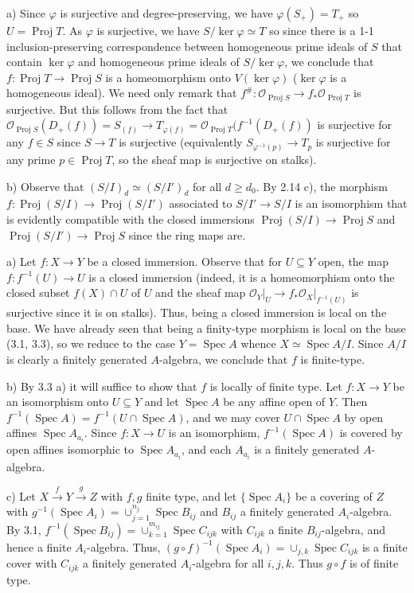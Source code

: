 \documentclass{report}
\renewcommand{\O}{\mathcal{O}}
\DeclareMathOperator{\Spec}{Spec}
\DeclareMathOperator{\Proj}{Proj}
\begin{document}
\bigskip
{}	a)	Since $\varphi$ is surjective and degree-preserving, we have $\varphi(S_+)=T_+$ so $U=\Proj T$.
As $\varphi$ is surjective, we have $S/\ker\varphi\simeq T$ so since there is a 1-1 inclusion-preserving correspondence
between homogeneous prime ideals of $S$ that contain $\ker\varphi$ and homogeneous prime ideals
of $S/\ker\varphi$, we conclude that $f:\Proj T\rightarrow \Proj S$ is a homeomorphism onto $V(\ker\varphi)$
($\ker\varphi$ is a homogeneous ideal).  We need only remark that $f^{\#}:\O_{\Proj S}\rightarrow f_*\O_{\Proj T}$
is surjective.  But this follows from the fact that $\O_{\Proj S}(D_+(f))=S_{(f)}\rightarrow T_{\varphi(f)}=\O_{\Proj T}(f^{-1}(D_+(f))$
is surjective for any $f\in S$ since $S\rightarrow T$ is surjective (equivalently $S_{\varphi^{-1}(p)}\rightarrow T_{p}$
is surjective for any prime $p\in\Proj T$, so the sheaf map is surjective on stalks).

b)	Observe that $(S/I)_d\simeq (S/I')_d$ for all $d\ge d_0$.  By 2.14 c), the morphism $f:\Proj (S/I)\rightarrow \Proj (S/I')$
associated to $S/I'\rightarrow S/I$ is an isomorphism that is evidently compatible with the closed immersions
$\Proj (S/I)\rightarrow \Proj S$ and $\Proj (S/I')\rightarrow \Proj S$ since the ring maps are.



\bigskip
{}	a)	Let $f:X\rightarrow Y$ be a closed immersion.		Observe that for $U\subseteq Y$
open, the map $f:f^{-1}(U)\rightarrow U$ is a closed immersion (indeed, it is a homeomorphism
onto the closed subset $f(X)\cap U$ of $U$ and the sheaf map $\O_Y\big|_{U}\rightarrow f_*\O_X\big|_{f^{-1}(U)}$
is surjective since it is on stalks).  Thus, being a closed immersion is local on the base.
We have already seen that being a finity-type morphism is local on the base (3.1, 3.3), so we
reduce to the case $Y=\Spec A$ whence $X\simeq \Spec A/I$.	Since $A/I$ is clearly a finitely
generated $A$-algebra, we conclude that $f$ is finite-type.

\noindent
b)	By 3.3 a) it will suffice to show that $f$ is locally of finite type.
Let $f:X\rightarrow Y$ be an isomorphism onto $U\subseteq Y$ and let $\Spec A$
be any affine open of $Y$.  Then $f^{-1}(\Spec A)=f^{-1}(U\cap \Spec A)$, and we may cover $U\cap \Spec A$
by open affines $\Spec A_{a_i}$.  Since $f:X\rightarrow U$ is an isomorphism, $f^{-1}(\Spec A)$ is covered by
open affines isomorphic to $\Spec A_{a_i}$, and each $A_{a_i}$ is a finitely generated $A$-algebra.


\noindent
c)	Let $X\xrightarrow{f} Y\xrightarrow{g} Z$ with $f,g$ finite type, and let $\{\Spec A_i\}$ be a covering of $Z$
with $g^{-1}(\Spec A_i)=\cup_{j=1}^{n_j} \Spec B_{ij}$ and $B_{ij}$ a finitely generated $A_i$-algebra.
By 3.1, $f^{-1}(\Spec B_{ij})=\cup_{k=1}^{m_{ij}} \Spec C_{ijk}$ with $C_{ijk}$ a finite $B_{ij}$-algebra,
and hence a finite $A_i$-algebra.  Thus, $(g\circ f)^{-1}(\Spec A_i)=\cup_{j,k} \Spec C_{ijk}$ is a finite
cover with $C_{ijk}$ a finitely generated $A_i$-algebra for all $i,j,k$.  Thus $g\circ f$ is of finite type.
\end{document}
